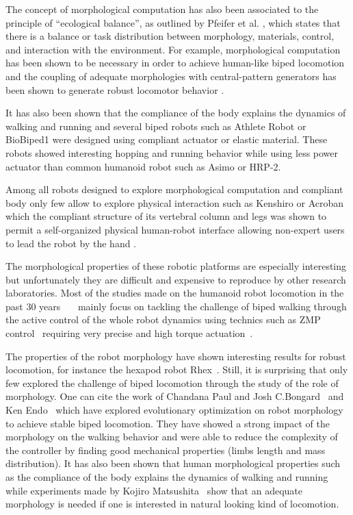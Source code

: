 The concept of morphological computation has also been associated to the principle of “ecological balance”, as outlined by Pfeifer et al.
\cite{pfeifer2005new}, which states that there is a balance or task distribution between morphology, materials, control, and interaction with the environment.
For example, morphological computation has been shown to be necessary in order to achieve human-like biped locomotion \cite{matsushita2005locomoting} and the coupling of adequate morphologies with central-pattern generators has been shown to generate robust locomotor behavior \cite{ijspeert2007swimming}\cite{steingrube2010self}.


It has also been shown that the compliance of the body explains the dynamics of walking and running \cite{Geyer2006} and several biped robots such as Athlete Robot \cite{niiyama2010athlete} or BioBiped1 \cite{radkhah2011concept} were designed using compliant actuator or elastic material.
These robots showed interesting hopping and running behavior while using less power actuator than common humanoid robot such as Asimo or HRP-2.

Among all robots designed to explore morphological computation and compliant body only few allow to explore physical interaction such as Kenshiro \cite{Asano2012} or Acroban which the compliant structure of its vertebral column and legs was shown to permit a self-organized physical human-robot interface allowing non-expert users to lead the robot by the hand \cite{Ly2011bio}\cite{Oudeyer2011}.

The morphological properties of these robotic platforms are especially interesting but unfortunately they are difficult and expensive to reproduce by other research laboratories.
Most of the studies made on the humanoid robot locomotion in the past 30 years~\cite{park1998biped}~\cite{aoi2005locomotion}~\cite{park1998biped} mainly focus on tackling the challenge of biped walking through the active control of the whole robot dynamics using technics such as ZMP control~\cite{vukobratovic2004zero} requiring very precise and high torque actuation~\cite{akachi2005development}.

The properties of the robot morphology have shown interesting results for robust locomotion, for instance the hexapod robot Rhex~\cite{saranli2001rhex}.
Still, it is surprising that only few explored the challenge of biped locomotion through the study of the role of morphology.
One can cite the work of Chandana Paul and Josh C.Bongard~\cite{paul2001road} and Ken Endo~\cite{endo2002co} which have explored evolutionary optimization on robot morphology to achieve stable biped locomotion.
They have showed a strong impact of the morphology on the walking behavior and were able to reduce the complexity of the controller by finding good mechanical properties (limbs length and mass distribution).
It has also been shown that human morphological properties such as the compliance of the body explains the dynamics of walking and running \cite{Geyer2006} while experiments made by Kojiro Matsushita~\cite{matsushita2005locomoting} show that an adequate morphology is needed if one is interested in natural looking kind of locomotion.




